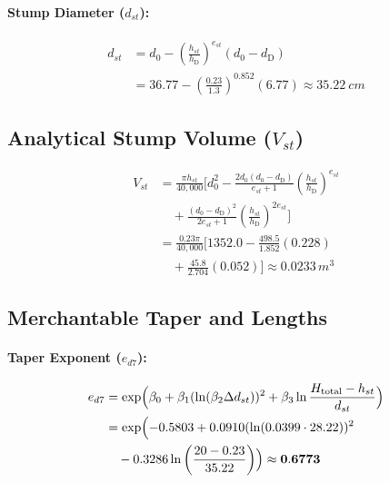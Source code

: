 \documentclass[twocolumn, bibliography=totoc]{scrartcl}
\begin{document}
\paragraph{Stump Diameter ($d_{st}$):}
\begin{equation}
\begin{aligned}
  d_{st} &= d_0 - \left( \frac{h_{st}}{h_{\text{D}}} \right)^{e_{st}} (d_0 - d_{\text{D}}) \\
  &= 36.77 - \left( \frac{0.23}{1.3} \right)^{0.852} (6.77) \approx \qty{35.22}{cm}
\end{aligned}
\end{equation}

\subsection{Analytical Stump Volume ($V_{st}$)}
\begin{equation}
\begin{aligned}
    V_{st} &= \frac{\pi h_{st}}{40,000} \biggl[ d_0^2 - \frac{2 d_0 (d_0 - d_{\text{D}})}{e_{st}+1} \left(\frac{h_{st}}{h_{\text{D}}}\right)^{e_{st}} \\
    &\quad + \frac{(d_0 - d_{\text{D}})^2}{2e_{st}+1} \left(\frac{h_{st}}{h_{\text{D}}}\right)^{2e_{st}} \biggr] \\
    &= \frac{0.23 \pi}{40,000} \biggl[ 1352.0 - \frac{498.5}{1.852} (0.228) \\
    &\quad + \frac{45.8}{2.704} (0.052) \biggr] \approx \mathbf{0.0233} \, \unit{m^3}
\end{aligned}
\end{equation}

\subsection{Merchantable Taper and Lengths}
\paragraph{Taper Exponent ($e_{d7}$):}
\begin{equation}
\begin{aligned}
    e_{d7} &= \exp \Bigl( \beta_0 + \beta_1 (\ln(\beta_2 \Delta d_{st}))^2 + \beta_3 \ln \frac{H_{\text{total}} - h_{st}}{d_{st}} \Bigr) \\
    &= \exp \Bigl( -0.5803 + 0.0910 (\ln(0.0399 \cdot 28.22))^2 \\
    &\quad - 0.3286 \ln\left( \frac{20 - 0.23}{35.22} \right) \Bigr) \approx \mathbf{0.6773}
\end{aligned}
\end{equation}
\end{document}
